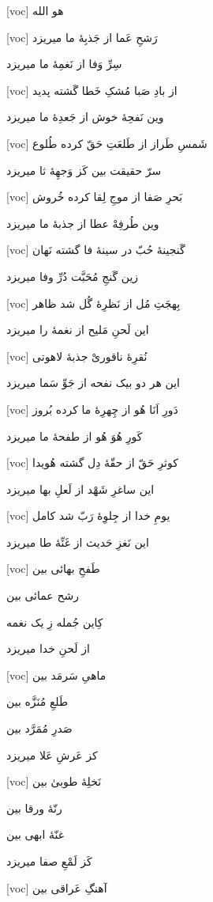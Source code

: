 \documentclass[11pt]{article}
\newenvironment{orig}
  {\begin{farsi}[voc]}
  {\end{farsi}}
\newenvironment{word}{}{}
\newcommand{\ayat}[1]{\vspace{4ex}\begin{orig}#1\end{orig}}
\begin{document}
\fontsize{24}{32}

\thispagestyle{empty}

\begin{word}
\ayat{
هو الله
}

\ayat{
رَشحِ عَما از جَذبِۀ ما میریزد

سِرِّ وَفا از نَغمِۀ ما میریزد
}

\ayat{
از بادِ صَبا مُشکِ خَطا گَشته پدید

وین نَفحِۀ خوش از جَعدِۀ ما میریزد
}

\ayat{
شَمسِ طَراز از طَلعَتِ حَقّ کرده طُلوع

سرّ حقیقت بین کَز وَجهِۀ ثا میریزد
}

\ayat{
بَحرِ صَفا از موجِ لِقا کرده خُروش

وین طُرفِهْ عطا از جذبۀ ما میریزد
}

\ayat{
گَنجینۀ حُبّ در سینۀ فا گشته نَهان

زین گَنجِ مُحَبَّت دُرِّ وفا ميريزد
}

\ayat{
بِهجَتِ مُل از نَظرِۀ گُل شد ظاهر

این لَحنِ مَلیح از نغمۀ را میریزد
}

\ayat{
نُقرِۀ ناقوریْ جذبۀ لاهوتی

این هر دو بیک نفحه از جَوِّ سَما میریزد
}

\ayat{
دَورِ اَنَا هُو از چِهرِۀ ما کرده بُروز

کَورِ هُوَ هُو از طفحۀ ما میریزد
}

\ayat{
کوثرِ حَقّ از حقّۀ دِل گشته هُویدا

این ساغرِ شَهْد از لَعلِ بها میریزد
}

\ayat{
یومِ خدا از جِلوِۀ رَبّ شد کامل

این نَغزِ حَدیث از غَنِّۀ طا میریزد
}

\ayat{
طَفحِ بهائی بین

رشح عمائی بین

کِاین جُمله زِ یک نغمه

از لَحنِ خدا میریزد
}

\ayat{
ماهیِ سَرمَد بین

طَلعِ مُنَزَّه بین

صَدرِ مُمَرَّد بین

کز عَرشِ عَلا میریزد
}

\ayat{
نَخلِۀ طوبیٰ بین

رنّۀ ورقا بین

غنّۀ ابهی بین

کَز لَمْعِ صفا میریزد
}

\ayat{
آهنگِ عَراقی بین

}
\end{word}
\end{document}
